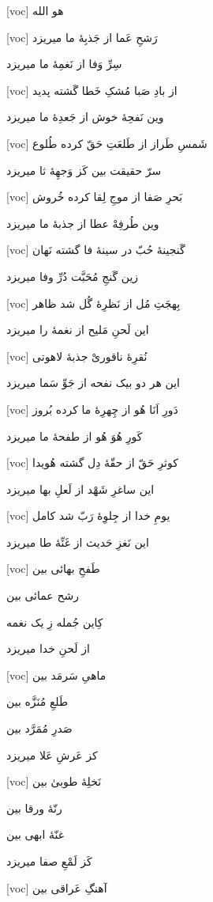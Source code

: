 \documentclass[11pt]{article}
\newenvironment{orig}
  {\begin{farsi}[voc]}
  {\end{farsi}}
\newenvironment{word}{}{}
\newcommand{\ayat}[1]{\vspace{4ex}\begin{orig}#1\end{orig}}
\begin{document}
\fontsize{24}{32}

\thispagestyle{empty}

\begin{word}
\ayat{
هو الله
}

\ayat{
رَشحِ عَما از جَذبِۀ ما میریزد

سِرِّ وَفا از نَغمِۀ ما میریزد
}

\ayat{
از بادِ صَبا مُشکِ خَطا گَشته پدید

وین نَفحِۀ خوش از جَعدِۀ ما میریزد
}

\ayat{
شَمسِ طَراز از طَلعَتِ حَقّ کرده طُلوع

سرّ حقیقت بین کَز وَجهِۀ ثا میریزد
}

\ayat{
بَحرِ صَفا از موجِ لِقا کرده خُروش

وین طُرفِهْ عطا از جذبۀ ما میریزد
}

\ayat{
گَنجینۀ حُبّ در سینۀ فا گشته نَهان

زین گَنجِ مُحَبَّت دُرِّ وفا ميريزد
}

\ayat{
بِهجَتِ مُل از نَظرِۀ گُل شد ظاهر

این لَحنِ مَلیح از نغمۀ را میریزد
}

\ayat{
نُقرِۀ ناقوریْ جذبۀ لاهوتی

این هر دو بیک نفحه از جَوِّ سَما میریزد
}

\ayat{
دَورِ اَنَا هُو از چِهرِۀ ما کرده بُروز

کَورِ هُوَ هُو از طفحۀ ما میریزد
}

\ayat{
کوثرِ حَقّ از حقّۀ دِل گشته هُویدا

این ساغرِ شَهْد از لَعلِ بها میریزد
}

\ayat{
یومِ خدا از جِلوِۀ رَبّ شد کامل

این نَغزِ حَدیث از غَنِّۀ طا میریزد
}

\ayat{
طَفحِ بهائی بین

رشح عمائی بین

کِاین جُمله زِ یک نغمه

از لَحنِ خدا میریزد
}

\ayat{
ماهیِ سَرمَد بین

طَلعِ مُنَزَّه بین

صَدرِ مُمَرَّد بین

کز عَرشِ عَلا میریزد
}

\ayat{
نَخلِۀ طوبیٰ بین

رنّۀ ورقا بین

غنّۀ ابهی بین

کَز لَمْعِ صفا میریزد
}

\ayat{
آهنگِ عَراقی بین

}
\end{word}
\end{document}
